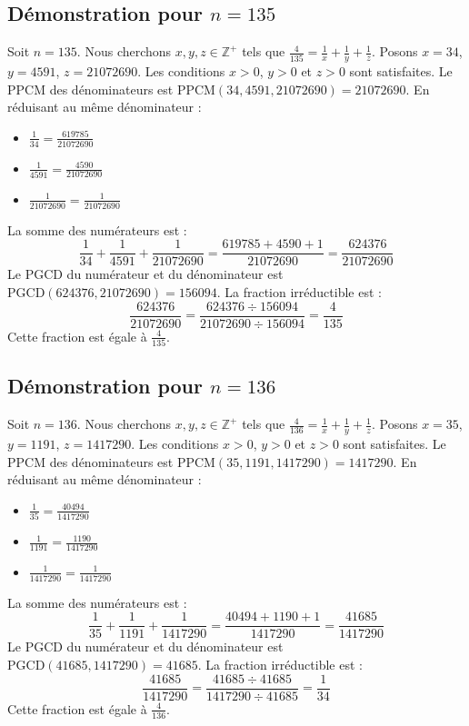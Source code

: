 \documentclass[11pt,a4paper]{article}
\begin{document}
\subsection{Démonstration pour $n = 135$}
Soit $n = 135$. Nous cherchons $x, y, z \in \mathbb{Z}^{+}$ tels que $\frac{4}{135} = \frac{1}{x} + \frac{1}{y} + \frac{1}{z}$.
Posons $x = 34$, $y = 4591$, $z = 21072690$.
Les conditions $x > 0$, $y > 0$ et $z > 0$ sont satisfaites.
Le PPCM des dénominateurs est $\text{PPCM}(34, 4591, 21072690) = 21072690$.
En réduisant au même dénominateur :
\begin{itemize}
    \item $\frac{1}{34} = \frac{619785}{21072690}$
    \item $\frac{1}{4591} = \frac{4590}{21072690}$
    \item $\frac{1}{21072690} = \frac{1}{21072690}$
\end{itemize}
La somme des numérateurs est :
$$ \frac{1}{34} + \frac{1}{4591} + \frac{1}{21072690} = \frac{619785 + 4590 + 1}{21072690} = \frac{624376}{21072690} $$
Le PGCD du numérateur et du dénominateur est $\text{PGCD}(624376, 21072690) = 156094$.
La fraction irréductible est :
$$ \frac{624376}{21072690} = \frac{624376 \div 156094}{21072690 \div 156094} = \frac{4}{135} $$
Cette fraction est égale à $\frac{4}{135}$.

\subsection{Démonstration pour $n = 136$}
Soit $n = 136$. Nous cherchons $x, y, z \in \mathbb{Z}^{+}$ tels que $\frac{4}{136} = \frac{1}{x} + \frac{1}{y} + \frac{1}{z}$.
Posons $x = 35$, $y = 1191$, $z = 1417290$.
Les conditions $x > 0$, $y > 0$ et $z > 0$ sont satisfaites.
Le PPCM des dénominateurs est $\text{PPCM}(35, 1191, 1417290) = 1417290$.
En réduisant au même dénominateur :
\begin{itemize}
    \item $\frac{1}{35} = \frac{40494}{1417290}$
    \item $\frac{1}{1191} = \frac{1190}{1417290}$
    \item $\frac{1}{1417290} = \frac{1}{1417290}$
\end{itemize}
La somme des numérateurs est :
$$ \frac{1}{35} + \frac{1}{1191} + \frac{1}{1417290} = \frac{40494 + 1190 + 1}{1417290} = \frac{41685}{1417290} $$
Le PGCD du numérateur et du dénominateur est $\text{PGCD}(41685, 1417290) = 41685$.
La fraction irréductible est :
$$ \frac{41685}{1417290} = \frac{41685 \div 41685}{1417290 \div 41685} = \frac{1}{34} $$
Cette fraction est égale à $\frac{4}{136}$.
\end{document}
